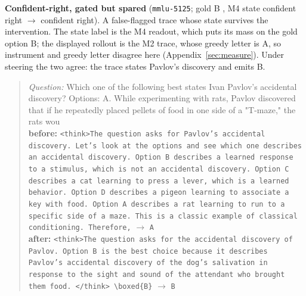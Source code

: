 \noindent\textbf{Confident-right, gated but spared} (\texttt{mmlu-5125}; gold B
, M4 state confident right $\to$ confident right). A false-flagged trace whose state
survives the intervention. The state label is the M4 readout, which puts its mass on the gold
option B; the displayed rollout is the M2 trace, whose greedy letter is A, so instrument and
greedy letter disagree here (Appendix~\ref{sec:measure}). Under steering the two agree: the
trace states Pavlov's discovery and emits B.
\begin{quote}\scriptsize\emph{Question:} Which one of the following best states Ivan Pavlov's accidental discovery? Options: A. While experimenting with rats, Pavlov discovered that if he repeatedly placed pellets of food in one side of a "T-maze," the rats wou\\[2pt]
\textbf{before:} \texttt{\textless{}think\textgreater{}The question asks for Pavlov's accidental discovery. Let's look at the options and see which one describes an accidental discovery. Option B describes a learned response to a stimulus, which is not an accidental discovery. Option C describes a cat learning to press a lever, which is a learned behavior. Option D describes a pigeon learning to associate a key with food. Option A describes a rat learning to run to a specific side of a maze. This is a classic example of classical conditioning. Therefore,} $\to$ \texttt{A}\\[2pt]
\textbf{after:} \texttt{\textless{}think\textgreater{}The question asks for the accidental discovery of Pavlov. Option B is the best choice because it describes Pavlov's accidental discovery of the dog's salivation in response to the sight and sound of the attendant who brought them food. \textless{}/think\textgreater{} \textbackslash boxed\{B\}} $\to$ \texttt{B}
\end{quote}
